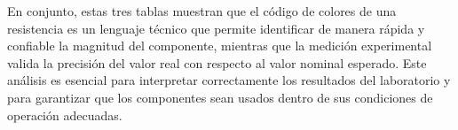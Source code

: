 En conjunto, estas tres tablas muestran que el código de colores de una resistencia es un lenguaje técnico que permite identificar de manera rápida y confiable la magnitud del componente, mientras que la medición experimental valida la precisión del valor real con respecto al valor nominal esperado. Este análisis es esencial para interpretar correctamente los resultados del laboratorio y para garantizar que los componentes sean usados dentro de sus condiciones de operación adecuadas.

